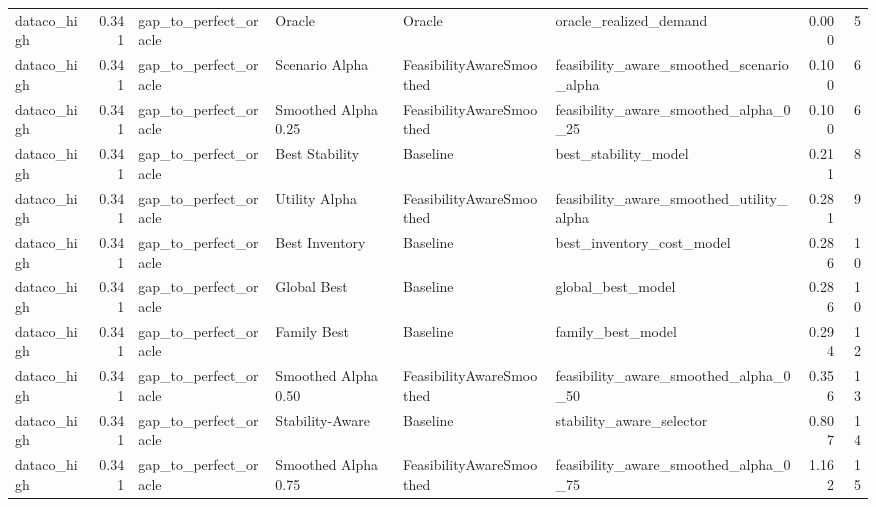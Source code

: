 \begin{table}
{\begin{tabular}{lrllllrr}
   dataco\_high &             0.341 &       gap\_to\_perfect\_oracle &                Oracle &                    Oracle &                             oracle\_realized\_demand &         0.000 &               5 \\
   dataco\_high &             0.341 &       gap\_to\_perfect\_oracle &        Scenario Alpha &  FeasibilityAwareSmoothed &          feasibility\_aware\_smoothed\_scenario\_alpha &         0.100 &               6 \\
   dataco\_high &             0.341 &       gap\_to\_perfect\_oracle &   Smoothed Alpha 0.25 &  FeasibilityAwareSmoothed &              feasibility\_aware\_smoothed\_alpha\_0\_25 &         0.100 &               6 \\
   dataco\_high &             0.341 &       gap\_to\_perfect\_oracle &        Best Stability &                  Baseline &                               best\_stability\_model &         0.211 &               8 \\
   dataco\_high &             0.341 &       gap\_to\_perfect\_oracle &         Utility Alpha &  FeasibilityAwareSmoothed &           feasibility\_aware\_smoothed\_utility\_alpha &         0.281 &               9 \\
   dataco\_high &             0.341 &       gap\_to\_perfect\_oracle &        Best Inventory &                  Baseline &                          best\_inventory\_cost\_model &         0.286 &              10 \\
   dataco\_high &             0.341 &       gap\_to\_perfect\_oracle &           Global Best &                  Baseline &                                  global\_best\_model &         0.286 &              10 \\
   dataco\_high &             0.341 &       gap\_to\_perfect\_oracle &           Family Best &                  Baseline &                                  family\_best\_model &         0.294 &              12 \\
   dataco\_high &             0.341 &       gap\_to\_perfect\_oracle &   Smoothed Alpha 0.50 &  FeasibilityAwareSmoothed &              feasibility\_aware\_smoothed\_alpha\_0\_50 &         0.356 &              13 \\
   dataco\_high &             0.341 &       gap\_to\_perfect\_oracle &       Stability-Aware &                  Baseline &                           stability\_aware\_selector &         0.807 &              14 \\
   dataco\_high &             0.341 &       gap\_to\_perfect\_oracle &   Smoothed Alpha 0.75 &  FeasibilityAwareSmoothed &              feasibility\_aware\_smoothed\_alpha\_0\_75 &         1.162 &              15 \\

\end{tabular}}
\end{table}
